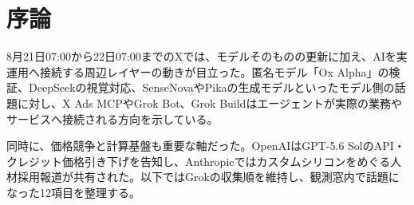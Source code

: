 \section{序論}
8月21日07:00から22日07:00までのXでは、モデルそのものの更新に加え、AIを実運用へ接続する周辺レイヤーの動きが目立った。匿名モデル「Ox Alpha」の検証、DeepSeekの視覚対応、SenseNovaやPikaの生成モデルといったモデル側の話題に対し、X Ads MCPやGrok Bot、Grok Buildはエージェントが実際の業務やサービスへ接続される方向を示している。

同時に、価格競争と計算基盤も重要な軸だった。OpenAIはGPT-5.6 SolのAPI・クレジット価格引き下げを告知し、Anthropicではカスタムシリコンをめぐる人材採用報道が共有された。以下ではGrokの収集順を維持し、観測窓内で話題になった12項目を整理する。
